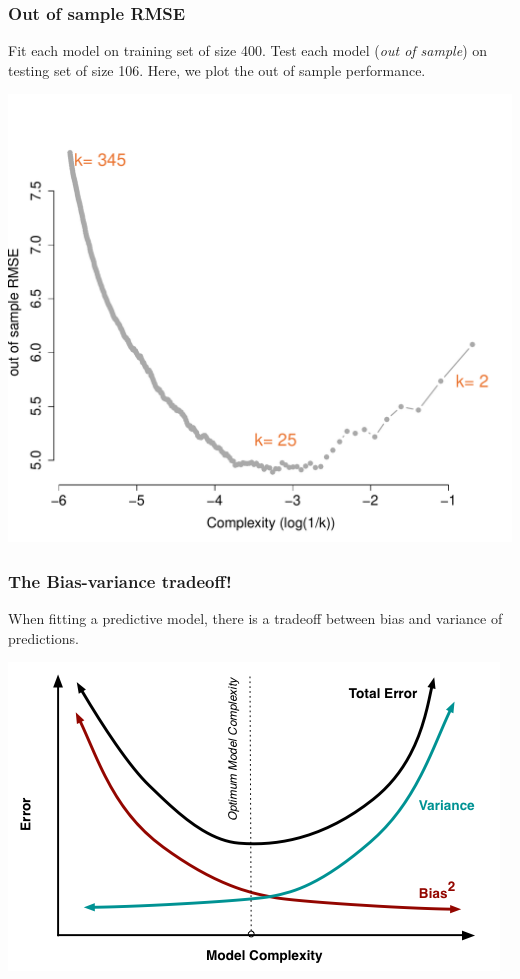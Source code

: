 \documentclass{beamer}
\newcommand{\bo}[1]{\textcolor{burntorange}{#1}}
\begin{document}
\begin{frame}[plain]
\frametitle{Out of sample RMSE}
\vspace{4mm}

Fit each model on training set of size \bo{400}. Test each model ({\it out of sample}) on testing set of size \bo{106}.  Here, we plot the out of sample performance.   

\vspace{-12mm}
\begin{center}
\includegraphics[scale=.39]{DaveBostonplotOUTMSE.pdf}
\end{center}
\end{frame}

\begin{frame}[plain]
\frametitle{The Bias-variance tradeoff!}
\vspace{4mm}
When fitting a predictive model, there is a tradeoff between \bo{bias} and \bo{variance} of predictions.  
\vspace{5mm}
\begin{center}
\includegraphics[scale=.5]{biasvariance}
\end{center}
\end{frame}
\end{document}
